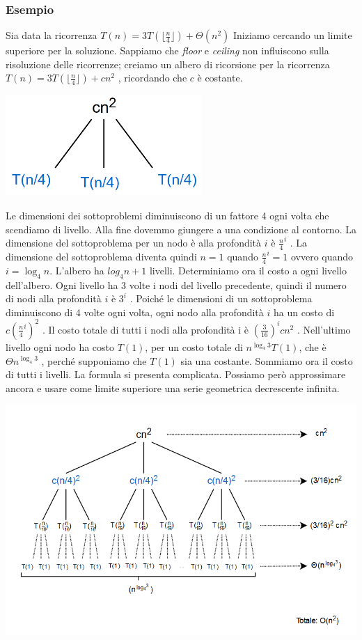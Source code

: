 \documentclass[11pt,a4paper]{article}
\begin{document}
\subsubsection{Esempio}
Sia data la ricorrenza $T(n) = 3T(\lfloor \frac{n}{4} \rfloor) + \Theta (n^2)$
Iniziamo cercando un limite superiore per la soluzione.
Sappiamo che \emph{floor} e \emph{ceiling} non influiscono sulla risoluzione delle ricorrenze; creiamo
un albero di ricorsione per la ricorrenza $T(n) = 3T(\lfloor \frac{n}{4} \rfloor) + cn^2$ , ricordando che $c$ è
costante.
\begin{center}
      \includegraphics[scale=0.5]{img/alberoricorrenze1.png}
\end{center}
Le dimensioni dei sottoproblemi
diminuiscono di un fattore 4 ogni volta che
scendiamo di livello. Alla fine dovemmo
giungere a una condizione al contorno.
La dimensione del sottoproblema per un
nodo è alla profondità $i$ è $\frac{n}{4}^i$ . La
dimensione del sottoproblema diventa
quindi $n=1$ quando $\frac{n}{4}^i =1$ ovvero quando $i
= \log_4 n$.
L’albero ha $log_4 n +1$ livelli.
Determiniamo ora il costo a ogni livello
dell’albero. Ogni livello ha 3 volte i nodi del
livello precedente, quindi il numero di nodi
alla profondità $i$ è $3^i$ . Poiché le dimensioni di
un sottoproblema diminuiscono di 4 volte ogni volta, ogni nodo alla profondità $i$ ha un costo di $c(\frac{n}{4}^i)^2$ . Il costo
totale di tutti i nodi alla profondità i è $(\frac{3}{16})^i cn^2$ . Nell’ultimo livello ogni nodo ha costo $T(1)$, per un costo totale
di $n^{\log_4 3} T(1)$, che è $\Theta n^{\log_4 3}$ , perché supponiamo che $T(1)$ sia una costante.
Sommiamo ora il costo di tutti i livelli. La formula si presenta complicata. Possiamo però approssimare ancora
e usare come limite superiore una serie geometrica decrescente infinita.
\begin{center}
      \includegraphics[scale=0.4]{img/alberoricorrenze2.png}
\end{center}
\end{document}

